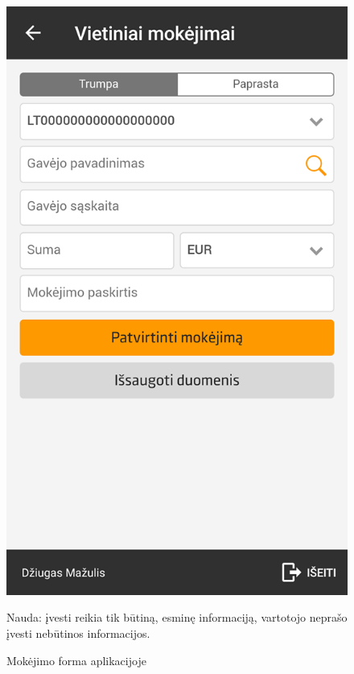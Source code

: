 \documentclass{VUMIFPSkursinis}
\begin{document}
\begin{figure}[!htb]
	\begin{center}
	\includegraphics[scale=0.4]{mobileAppPaymentForm.png}
	\end{center}
  \caption{Mokėjimo forma aplikacijoje}
	\label{fig:mobileAppPaymentForm}
	Nauda:  įvesti reikia tik būtiną, esminę informaciją, vartotojo neprašo įvesti nebūtinos informacijos.
\end{figure}
\end{document}
